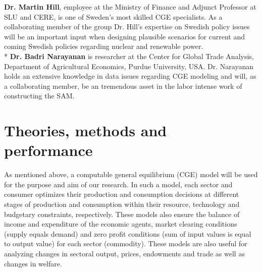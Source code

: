 \textbf{Dr. Martin Hill}, employee at the Ministry of Finance and Adjunct Professor at SLU and CERE, is one of Sweden's most skilled CGE specialists. As a collaborating member of the group Dr. Hill’s expertise on Swedish policy issues will be an important input when designing plausible scenarios for current and coming Swedish policies regarding nuclear and renewable power.\\*
\textbf{Dr. Badri Narayanan} is researcher at the Center for Global Trade Analysis, Department of Agricultural Economics, Purdue University, USA. Dr. Narayanan holds an extensive knowledge in data issues regarding CGE modeling and will, as a collaborating member, be an tremendous asset in the labor intense work of constructing the SAM.

\section{Theories, methods and performance}
\begin{comment}
	2 Method and performance
		• Feasibility and adequacy of scientific methods
		• Innovativeness and boldness of methodology
		• Concrete and realistic work plan
		• Concrete and realistic plan for scientific deliverables
		• Coordination of project and research group
		• Suitability of multi- and interdisciplinary approaches
		• Ethical considerations
		Clarifications:
		• Feasibility and adequacy of scientific approaches and methods should receive primary
			consideration
	3 Scientific competence
		• Quality of scientific publications
		• Ability to carry out the project according to plan
		• Adequate experience of project management
		• National and international activities, including projects, networks, assignments,
			commissions of trust, and participating at or arranging workshops or conferences
		• Strength and competitiveness of the research team
		Clarifications:
		• Quality of scientific publications should be assessed taking into account the
			standards within each scientific field
		• When several researchers collaborate, assessment of scientific competence is made
			both of each researcher separately and of the research group collectively
		• For starting mobility grants, strength and competitiveness of the research environment
			should be assessed for the home university and the host university
\end{comment}
As mentioned above, a computable general equilibrium (CGE) model will be used for the purpose and aim of our research. In such a model, each sector and consumer optimizes their production and consumption decisions at different stages of production and consumption within their resource, technology and budgetary constraints, respectively. These models also ensure the balance of income and expenditure of the economic agents, market clearing conditions (supply equals demand) and zero profit conditions (sum of input values is equal to output value) for each sector (commodity). These models are also useful for analyzing changes in sectoral output, prices, endowments and trade as well as changes in welfare.

